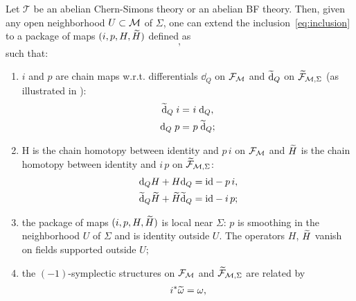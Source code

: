 \begin{theorem}
\label{theor:gluing}
    Let $\mathcal{T}$ be an abelian Chern-Simons theory or an abelian BF theory.
    Then, given any open neighborhood $U \subset \mathcal{M}$ of $\Sigma$, one can extend the inclusion~\ref{eq:inclusion} to a package of maps $(i, p, H, \widetilde{H})$ defined as
    \begin{equation}
    \label{eq:theorem_maps}
        ,
    \end{equation}
    such that:
    \begin{enumerate}[label={\textup{\alph*)}}]
        \item \label{enum:theor_a} $i$ and $p$ are chain maps w.r.t. differentials $\dd_Q$ on $\mathcal{F}_{\mathcal{M}}$ and $\widetilde{\dd}_Q$ on $\widetilde{\mathcal{F}}_{\mathcal{M}, \Sigma}$ (as illustrated in ):
        \begin{equation}
        \label{eq:theor_a}
            \begin{aligned}
                \widetilde{\dd}_Q \; i =& \,\, i \; \dd_Q , \\
                \dd_Q \; p =& \,\, p \; \widetilde{\dd}_Q;
            \end{aligned}
        \end{equation}
        \item \label{enum:theor_b} H is the chain homotopy between identity and $p \, i$ on $\mathcal{F}_{\mathcal{M}}$ and $\widetilde{H}$ is the chain homotopy between identity and $i \, p$ on $\widetilde{\mathcal{F}}_{\mathcal{M}, \Sigma}$:
        \begin{equation}
        \label{eq:theo_b}
            \begin{aligned}
                \dd_Q H + H \dd_Q =&
                \; \text{\textup{id}} - p \, i , \\
                \widetilde{\dd}_Q \widetilde{H} + \widetilde{H} \widetilde{\dd}_Q =&
                \; \text{\textup{id}} - i \, p ;
            \end{aligned}
        \end{equation}
        \item \label{enum:theor_c} the package of maps $(i, p, H, \widetilde{H})$ is local near $\Sigma$:
        $p$ is smoothing in the neighborhood $U$ of $\Sigma$ and is identity outside $U$. The operators $H$, $\widetilde{H}$ vanish on fields supported outside $U$;
        \item \label{enum:theor_d} the $(-1)$-symplectic structures on $\mathcal{F}_{\mathcal{M}}$ and $\widetilde{\mathcal{F}}_{\mathcal{M}, \Sigma}$ are related by
        \begin{align}
        \label{eq:requ_lemma}
            i^* \wt{\omega} =& \; \omega , \\

\end{align}
\end{enumerate}
\end{theorem}
